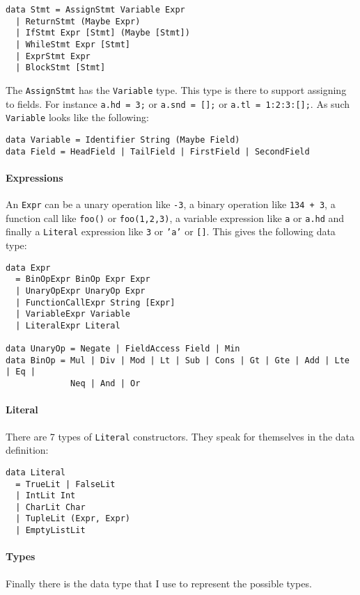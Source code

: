 \documentclass{report}
\begin{document}
\begin{verbatim}
data Stmt = AssignStmt Variable Expr
  | ReturnStmt (Maybe Expr)
  | IfStmt Expr [Stmt] (Maybe [Stmt])
  | WhileStmt Expr [Stmt]
  | ExprStmt Expr
  | BlockStmt [Stmt]
\end{verbatim} 
The \texttt{AssignStmt} has the \texttt{Variable} type. This type is there to support assigning to fields. For instance \texttt{a.hd = 3;} or \texttt{a.snd = [];} or \texttt{a.tl = 1:2:3:[];}. As such \texttt{Variable} looks like the following:
\begin{verbatim}
data Variable = Identifier String (Maybe Field)
data Field = HeadField | TailField | FirstField | SecondField
\end{verbatim} 

\paragraph{Expressions}

An \texttt{Expr} can be a unary operation like \texttt{-3}, a binary operation like \texttt{134 + 3}, a function call like \texttt{foo()} or \texttt{foo(1,2,3)}, a variable expression like \texttt{a} or \texttt{a.hd} and finally a \texttt{Literal} expression like \texttt{3} or \texttt{'a'} or \texttt{[]}. This gives the following data type:

\begin{lstlisting}[style=Haskell]
data Expr 
  = BinOpExpr BinOp Expr Expr 
  | UnaryOpExpr UnaryOp Expr
  | FunctionCallExpr String [Expr]
  | VariableExpr Variable
  | LiteralExpr Literal
  
data UnaryOp = Negate | FieldAccess Field | Min
data BinOp = Mul | Div | Mod | Lt | Sub | Cons | Gt | Gte | Add | Lte | Eq | 
             Neq | And | Or
\end{lstlisting}

\paragraph{Literal} There are 7 types of \texttt{Literal} constructors. They speak for themselves in the data definition:

\begin{verbatim}
data Literal 
  = TrueLit | FalseLit
  | IntLit Int
  | CharLit Char
  | TupleLit (Expr, Expr)
  | EmptyListLit
\end{verbatim}

\paragraph{Types}
Finally there is the data type that I use to represent the possible types. 
\end{document}
